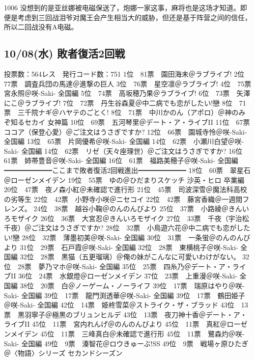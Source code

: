 1006 没想到的是亚丝娜被电磁保送了，炮娜一家这事，麻将也是这场才知道。即便是考虑到三回战泪爷对魔王会产生相当大的威胁，但还是基于阵营之间的信任，所以二回战没有A电磁。

\subsection{10/08(水) 敗者復活2回戦}

	投票数：564レス　発行コード数：751
	1位　81票　園田海未＠ラブライブ!
	2位　77票　調査兵団の馬達＠進撃の巨人
	3位　76票　星空凛＠ラブライブ!
	4位　75票　宮永照＠咲-Saki- 全国編
	5位　74票　高坂穂乃果＠ラブライブ!
	6位　73票　矢澤にこ＠ラブライブ!
	7位　72票　丹生谷森夏＠中二病でも恋がしたい!戀
	8位　71票　三千院ナギ＠ハヤテのごとく!
	8位　71票　中川かのん（アポロ）＠神のみぞ知るセカイ 女神篇
	10位　69票　五河琴里＠デート・ア・ライブII
	11位　67票　ココア（保登心愛）＠ご注文はうさぎですか?
	12位　66票　園城寺怜＠咲-Saki- 全国編
	13位　65票　片岡優希＠咲-Saki- 全国編
	14位　62票　小瀬川白望＠咲-Saki- 全国編
	14位　62票　リゼ（天々座理世）＠ご注文はうさぎですか?
	16位　61票　姉帯豊音＠咲-Saki- 全国編
	16位　61票　福路美穂子＠咲-Saki- 全国編
	━━━━━━━ここまで敗者復活2回戦進出━━━━━━━
	18位　60票　翠星石＠ローゼンメイデン
	19位　55票　ゆの＠ひだまりスケッチ 沙英・ヒロ 卒業編
	20位　47票　夜ノ森小紅＠未確認で進行形
	21位　45票　司波深雪＠魔法科高校の劣等生
	22位　42票　小野寺小咲＠ニセコイ
	22位　42票　藤宮香織＠一週間フレンズ。
	24位　38票　越谷小鞠＠のんのんびより
	25位　37票　小路綾＠きんいろモザイク
	26位　36票　大宮忍＠きんいろモザイク
	27位　33票　千夜（宇治松千夜）＠ご注文はうさぎですか?
	28位　32票　小鳥遊六花＠中二病でも恋がしたい!戀
	28位　32票　薄墨初美＠咲-Saki- 全国編
	30位　31票　一条蛍＠のんのんびより
	31位　29票　石戸霞＠咲-Saki- 全国編
	32位　28票　東横桃子＠咲-Saki- 全国編
	32位　28票　黒猫（五更瑠璃）＠俺の妹がこんなに可愛いわけがない。
	32位　28票　夢乃マホ＠咲-Saki- 全国編
	35位　25票　四糸乃＠デート・ア・ライブII
	36位　24票　水銀燈＠ローゼンメイデン
	37位　23票　上重漫＠咲-Saki- 全国編
	38位　20票　白＠ノーゲーム・ノーライフ
	39位　17票　瑞原はやり＠咲-Saki- 全国編
	39位　17票　龍門渕透華＠咲-Saki- 全国編
	39位　17票　鶴田姫子＠咲-Saki- 全国編
	42位　14票　姫柊雪菜＠ストライク・ザ・ブラッド
	43位　13票　黒羽寧子＠極黒のブリュンヒルデ
	43位　13票　夜刀神十香＠デート・ア・ライブII
	45位　11票　宮内れんげ＠のんのんびより
	45位　11票　真紅＠ローゼンメイデン
	45位　11票　三峰真白＠未確認で進行形
	45位　11票　鷺森灼＠咲-Saki- 全国編
	49位　9票　湊智花＠ロウきゅーぶ!SS
	49位　9票　戦場ヶ原ひたぎ＠〈物語〉シリーズ セカンドシーズン
